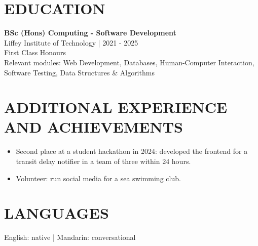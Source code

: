 \documentclass[11pt,a4paper]{article}
\newcommand{\cvsection}[1]{\section*{#1}}
\begin{document}
\cvsection{EDUCATION}
\textbf{BSc (Hons) Computing - Software Development}\\
Liffey Institute of Technology | 2021 - 2025\\
First Class Honours\\
Relevant modules: Web Development, Databases, Human-Computer Interaction, Software Testing, Data Structures \& Algorithms

\cvsection{ADDITIONAL EXPERIENCE AND ACHIEVEMENTS}
\begin{itemize}
\item Second place at a student hackathon in 2024: developed the frontend for a transit delay notifier in a team of three within 24 hours.
\item Volunteer: run social media for a sea swimming club.
\end{itemize}

\cvsection{LANGUAGES}
English: native | Mandarin: conversational
\end{document}
